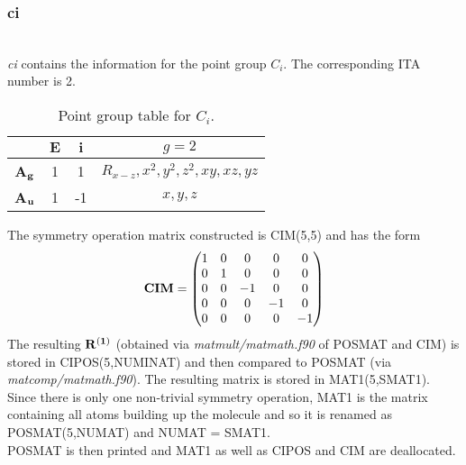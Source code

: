 \documentclass[a4paper,10pt]{scrartcl}
\begin{document}
\subsubsection{ci}
\\

\emph{ci} contains the information for the point group $C_{i}$. The corresponding ITA number is 2. 
\begin{table}[H]
\centering
\caption{Point group table for $C_{i}$.}
\begin{tabular}{c|cc|c}
 & $\bm{E}$ & $\bm{i}$ & $g=2$ \\\hline
 \bf{A}$_{\bf{g}}$ & 1 & 1 & $R_{x-z}, x^{2}, y^{2}, z^{2}, xy, xz, yz$ \\
 \bf{A}$_{\bf{u}}$ & 1 & -1& $x,y,z$\\\hline
\end{tabular}
\end{table}
The symmetry operation matrix constructed is CIM(5,5) and has the form
\[ \bf{CIM} = \begin{pmatrix} 1 & 0 & 0 & 0 & 0 \\
                                  0 & 1 & 0 & 0 & 0 \\
                                  0 & 0 & -1 & 0 & 0 \\
                                  0 & 0 & 0 & -1 & 0 \\
                                  0 & 0 & 0 & 0 & -1
                  \end{pmatrix}\]
The resulting $\bf{R}^{(1)}$ (obtained via \emph{matmult/matmath.f90} of POSMAT and CIM) is stored in CIPOS(5,NUMINAT) and then compared to POSMAT
(via \emph{matcomp/matmath.f90}). The resulting matrix is stored in MAT1(5,SMAT1). Since there is only one non-trivial symmetry operation, MAT1
is the matrix containing all atoms building up the molecule and so it is renamed as POSMAT(5,NUMAT) and NUMAT = SMAT1.\\
POSMAT is then printed and MAT1 as well as CIPOS and CIM are deallocated.
\end{document}
